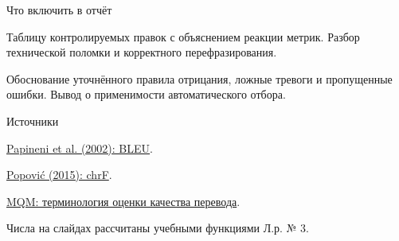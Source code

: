 \documentclass[aspectratio=169,12pt]{beamer}
\begin{document}
\begin{frame}{Что включить в отчёт}
\color{ink}
{\small Таблицу контролируемых правок с объяснением реакции метрик. Разбор технической поломки и корректного перефразирования.
\par\vspace{0.6em}Обоснование уточнённого правила отрицания, ложные тревоги и пропущенные ошибки. Вывод о применимости автоматического отбора.}

\end{frame}
\color{ink}
\begin{frame}{Источники}
\color{ink}
{\small \href{https://aclanthology.org/P02-1040/}{Papineni et al. (2002): BLEU}.
\par\vspace{0.6em}\href{https://aclanthology.org/W15-3049/}{Popović (2015): chrF}.
\par\vspace{0.6em}\href{https://www.w3.org/community/mqmcg/mqm-terminology/}{MQM: терминология оценки качества перевода}.
\par\vspace{0.6em}Числа на слайдах рассчитаны учебными функциями Л.р. № 3.}
\end{frame}
\end{document}
